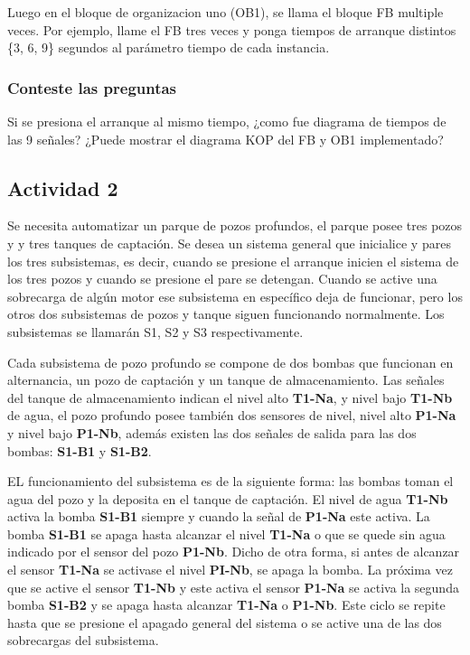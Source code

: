 	Luego en el bloque de organizacion uno (OB1), se llama el bloque  FB multiple veces. Por ejemplo, llame el FB tres veces y ponga tiempos de arranque distintos \{3, 6, 9\} segundos al parámetro tiempo  de  cada instancia.
	
 \subsubsection{Conteste las preguntas}
  
  Si se presiona el arranque al mismo tiempo, ¿como fue diagrama de tiempos de las 9 señales?
  ¿Puede mostrar el diagrama KOP del FB y OB1 implementado?
  

\subsection{Actividad 2}

Se necesita automatizar un parque de pozos profundos, el parque posee tres pozos y y tres tanques de captación. Se desea un sistema general que inicialice y pares los tres subsistemas, es decir, cuando se presione el arranque inicien el sistema de los tres pozos y cuando se presione el pare se detengan. Cuando se active una sobrecarga de algún motor ese subsistema en específico deja de funcionar, pero los otros dos subsistemas de pozos y tanque siguen funcionando normalmente. Los subsistemas se llamarán S1, S2 y S3 respectivamente.

Cada subsistema de pozo profundo se compone de dos bombas que funcionan en alternancia, un pozo de captación y un tanque de almacenamiento. Las señales del tanque de almacenamiento indican el nivel alto \textbf{T1-Na}, y nivel bajo \textbf{T1-Nb} de agua, el pozo profundo posee también dos sensores de nivel, nivel alto \textbf{P1-Na} y nivel bajo \textbf{P1-Nb}, además existen las dos señales de salida para las dos bombas: \textbf{S1-B1} y \textbf{S1-B2}. 

EL funcionamiento del subsistema es de la siguiente forma: las bombas toman el agua del pozo y la deposita en el tanque de captación. El nivel de agua \textbf{T1-Nb} activa la bomba \textbf{S1-B1} siempre y cuando la señal de \textbf{P1-Na} este activa. La bomba \textbf{S1-B1}  se apaga hasta alcanzar el nivel \textbf{T1-Na}  o que se quede sin agua indicado por el sensor del pozo \textbf{P1-Nb}. Dicho de otra forma, si antes de alcanzar el sensor \textbf{T1-Na} se activase el nivel \textbf{PI-Nb}, se apaga la bomba. La próxima vez que se active el sensor \textbf{T1-Nb}  y este activa el sensor \textbf{P1-Na} se activa la segunda bomba \textbf{S1-B2} y se apaga hasta alcanzar \textbf{T1-Na} o \textbf{P1-Nb}.   Este ciclo se repite hasta que se presione el apagado general del sistema o se active una de las dos sobrecargas del subsistema.

